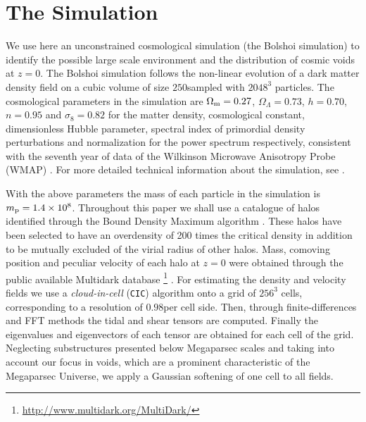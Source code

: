 \documentclass[a4,useAMS,usenatbib,usegraphicx]{latex/mn2e}
\begin{document}
\section{The Simulation}
\label{sec:the_simulation}


We use here an unconstrained cosmological simulation (the Bolshoi 
simulation) to identify the possible large scale environment and the 
distribution of cosmic voids at $z=0$. The Bolshoi simulation follows the 
non-linear evolution of a dark matter density field on a cubic volume of 
size $250$\hMpc sampled with $2048^3$ particles. The cosmological 
parameters in the simulation are $\Omega_{\rm m}=0.27$, $\Omega_{\Lambda}
=0.73$, $h=0.70$, $n=0.95$ and $\sigma_{8}=0.82$ for the matter density, 
cosmological constant, dimensionless Hubble parameter, spectral index of 
primordial density perturbations and normalization for the power spectrum
respectively, consistent with the seventh year of data of the Wilkinson 
Microwave Anisotropy Probe (WMAP) \citep{Jarosik11}. For more detailed 
technical information about the simulation, see \citet{Klypin11}.


With the above parameters the mass of each particle in the simulation is 
$m_{\rm p}=1.4\times 10^{8}$\hMsun. Throughout this paper we shall use a
catalogue of halos identified through the Bound Density Maximum algorithm
\citep{Klypin99}. These halos have been selected to have an overdensity of
200 times the critical density in addition to be mutually excluded of the
virial radius of other halos. Mass, comoving position and peculiar 
velocity of each halo at $z=0$ were obtained through the public available 
Multidark database \footnote{\url{http://www.multidark.org/MultiDark/}} 
\citep{Riebe11}. For estimating the density and velocity fields we use a 
\textit{cloud-in-cell} (\texttt{CIC}) algorithm onto a grid of $256^3$ 
cells, corresponding to a resolution of $0.98$\hMpc per cell side. Then, 
through finite-differences and FFT methods the tidal and shear tensors 
are computed. Finally the eigenvalues and eigenvectors of each tensor are
obtained for each cell of the grid. Neglecting substructures presented 
below Megaparsec scales and taking into account our focus in voids, which
are a prominent characteristic of the Megaparsec Universe, we apply a 
Gaussian softening of one cell to all fields.
\end{document}
